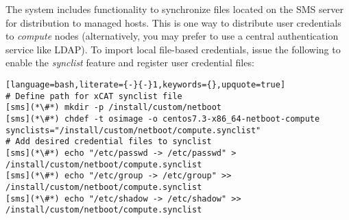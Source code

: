 The \xCAT{} system includes functionality to synchronize files located on the
SMS server for distribution to managed hosts. This is one way to
distribute user credentials to {\em compute} nodes (alternatively, you may
prefer to use a central authentication service like LDAP). To import local file-based
credentials, issue the following to enable the {\em synclist} feature and
register user credential files:

\begin{lstlisting}[language=bash,literate={-}{-}1,keywords={},upquote=true]
# Define path for xCAT synclist file
[sms](*\#*) mkdir -p /install/custom/netboot
[sms](*\#*) chdef -t osimage -o centos7.3-x86_64-netboot-compute synclists="/install/custom/netboot/compute.synclist"
# Add desired credential files to synclist
[sms](*\#*) echo "/etc/passwd -> /etc/passwd" > /install/custom/netboot/compute.synclist
[sms](*\#*) echo "/etc/group -> /etc/group" >> /install/custom/netboot/compute.synclist
[sms](*\#*) echo "/etc/shadow -> /etc/shadow" >> /install/custom/netboot/compute.synclist
\end{lstlisting}
